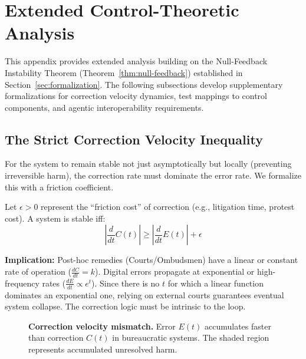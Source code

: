 \section{Extended Control-Theoretic Analysis}
\label{appendix:proofs}

This appendix provides extended analysis building on the Null-Feedback Instability Theorem (Theorem~\ref{thm:null-feedback}) established in Section~\ref{sec:formalization}. The following subsections develop supplementary formalizations for correction velocity dynamics, test mappings to control components, and agentic interoperability requirements.

\subsection{The Strict Correction Velocity Inequality}

For the system to remain stable not just asymptotically but locally (preventing irreversible harm), the correction rate must dominate the error rate. We formalize this with a friction coefficient.

\begin{condition}
\label{cond:friction}
Let $\epsilon > 0$ represent the ``friction cost'' of correction (e.g., litigation time, protest cost). A system is stable iff:
\begin{equation}
\left| \frac{d}{dt} C(t) \right| \ge \left| \frac{d}{dt} E(t) \right| + \epsilon
\end{equation}
\end{condition}

\textbf{Implication:} Post-hoc remedies (Courts/Ombudsmen) have a linear or constant rate of operation ($\frac{dC}{dt} = k$). Digital errors propagate at exponential or high-frequency rates ($\frac{dE}{dt} \propto e^{t}$). Since there is no $t$ for which a linear function dominates an exponential one, relying on external courts guarantees eventual system collapse. The correction logic must be intrinsic to the loop.

\begin{figure}[htbp]
\centering
{}
\caption{\textbf{Correction velocity mismatch.} Error $E(t)$ accumulates faster than correction $C(t)$ in bureaucratic systems. The shaded region represents accumulated unresolved harm.}
\label{fig:velocity-mismatch}
\end{figure}

